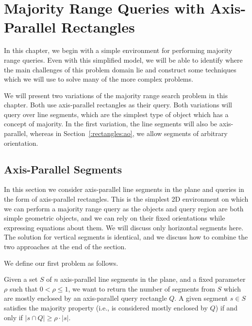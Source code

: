 \chapter{Majority Range Queries with Axis-Parallel Rectangles}
\label{:rectangles}

In this chapter, we begin with a simple environment for performing majority range queries. Even with this simplified model, we will be able to identify where the main challenges of this problem domain lie and construct some techniques which we will use to solve many of the more complex problems.

We will present two variations of the majority range search problem in this chapter. Both use axis-parallel rectangles as their query. Both variations will query over line segments, which are the simplest type of object which has a concept of majority. In the first variation, the line segments will also be axis-parallel, whereas in Section~\ref{:rectangles:ao}, we allow segments of arbitrary orientation.

\section{Axis-Parallel Segments}
\label{:rectangles:ap}

In this section we consider axis-parallel line segments in the plane and queries in the form of axis-parallel rectangles.
This is the simplest 2D environment on which we can perform a majority range query as the objects and query region are both simple geometric objects, and we can rely on their fixed orientations while expressing equations about them. 
We will discuss only horizontal segments here.
The solution for vertical segments is identical, and we discuss how to combine the two approaches at the end of the section.

We define our first problem as follows.

\begin{problem}
Given a set $S$ of $n$ axis-parallel line segments in the plane, and a fixed parameter $\rho$ such that $0 < \rho \leq 1$, we want to return the number of segments from $S$ which are mostly enclosed by an axis-parallel query rectangle $Q$. A given segment $s \in S$ satisfies the majority property (i.e., is considered mostly enclosed by $Q$) if and only if $|s \cap Q| \geq \rho \cdot |s|$.
\end{problem}


